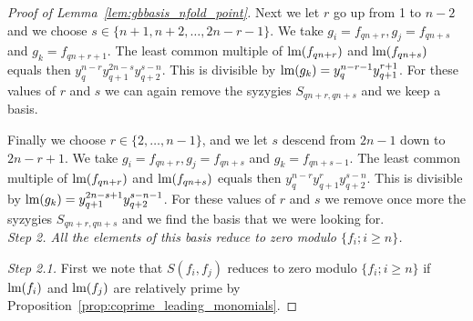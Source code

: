\begin{proof}[Proof of Lemma~\ref{lem:gbbasis_nfold_point}]
  Next we let $r$ go up from 1 to $n-2$ and we choose $s\in \{ n+ 1,n+2,\ldots , 2n-r-1\}$. We take $g_i=f_{qn+r}, g_j = f_{qn+s}$ and $g_k = f_{qn+r+1}$. The least common multiple of $\textnormal{lm}(f_{qn+r})$ and $\textnormal{lm}(f_{qn+s})$ equals then $y_q^{n-r}y_{q+1}^{2n-s}y_{q+2}^{s-n}$. This is divisible by $\textnormal{lm}(g_k)=y_q^{n-r-1}y_{q+1}^{r+1}$. For these values of $r$ and $s$ we can again remove the syzygies $S_{qn+r,qn+s}$ and we keep a basis.
  
  Finally we choose $r\in \{2,\ldots,n-1\}$, and we let $s$ descend from $2n-1$ down to $2n-r+1$. We take $g_i=f_{qn+r}, g_j = f_{qn+s}$ and $g_k = f_{qn+s-1}$. The least common multiple of $\textnormal{lm}(f_{qn+r})$ and $\textnormal{lm}(f_{qn+s})$ equals then $y_q^{n-r}y_{q+1}^{r}y_{q+2}^{s-n}$. This is divisible by $\textnormal{lm}(g_k)=y_{q+1}^{2n-s+1}y_{q+2}^{s-n-1}$. For these values of $r$ and $s$ we remove once more the syzygies $S_{qn+r,qn+s}$ and we find the basis that we were looking for.\\


  
\textit{Step 2. All the elements of this basis reduce to zero modulo $\{f_i; i\geq n\}$.}

\textit{Step 2.1.} First we note that $S(f_i,f_j)$ reduces to zero modulo $\{f_i; i\geq n\}$ if $\textnormal{lm}(f_i)$ and $\textnormal{lm}(f_j)$ are relatively prime by Proposition~\ref{prop:coprime_leading_monomials}.

\vspace{3mm}


\end{proof}
